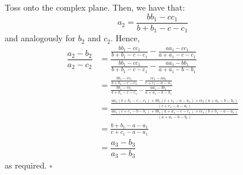 \documentclass{article}
\begin{document}
Toss onto the complex plane. Then, we have that: \[a_2 = \dfrac{bb_1-cc_1}{b+b_1-c-c_1}\] and analogously for $b_2$ and $c_2$. Hence, 
\begin{align*}
\dfrac{a_2-b_2}{a_2-c_2} &= \dfrac{\tfrac{bb_1-cc_1}{b+b_1-c-c_1}-\tfrac{aa_1-cc_1}{a+a_1-c-c_1}}{\tfrac{bb_1-cc_1}{b+b_1-c-c_1}-\tfrac{aa_1-bb_1}{a+a_1-b-b_1}} \\
&= \frac{\frac{bb_1-cc_1}{b+b_1-c-c_1}-\frac{cc_1-aa_1}{c+c_1-a-a_1}}{\frac{bb_1-cc_1}{b+b_1- c-c_1}-\frac{aa_1-bb_1}{a+a_1-b- b_1}} \\
&= \frac{\frac{aa_1(b+b_1-c-c_1)+bb_1(c+c_1-a-a_1) + cc_1(a+a_1-b-b_1)}{(c+c_1-a-a_1)}}{\frac{aa_1(c+c_1-b-b_1)+bb_1(a+a_1-c-c_1)+cc_1(b+b_1-a-a_1)}{(a+a_1-b-b_1)}} \\
&= \frac{b+b_1-a-a_1}{c+c_1-a-a_1} \\
&= \dfrac{a_3-b_3}{a_3-b_3}
\end{align*}
as required. $\square$
\end{document}

